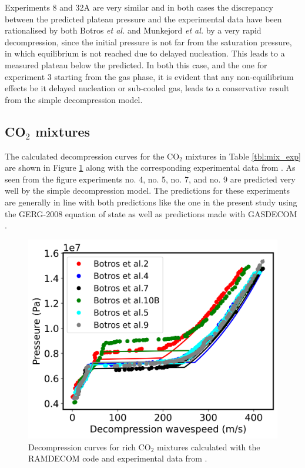 \documentclass[a4paper, 10pt, twocolumn, twoside]{scrartcl}
\begin{document}
Experiments 8 and 32A are very similar and in both cases the discrepancy between the predicted plateau pressure and the experimental data have been rationalised by both Botros \emph{et al.} \cite{Botros_pure} and Munkejord \emph{et al.} \cite{MUNKEJORD2020118560} by a very rapid decompression, since the initial pressure is not far from the saturation pressure, in which equilibrium is not reached due to delayed nucleation. This leads to a measured plateau below the predicted. In both this case, and the one for experiment 3 starting from the gas phase, it is evident that any non-equilibrium effects be it delayed nucleation or sub-cooled gas, leads to a conservative result from the simple decompression model. 



\subsection{CO$_2$ mixtures}
The calculated decompression curves for the CO$_2$ mixtures in Table \ref{tbl:mix_exp} are shown in Figure \ref{fig:mix_combined} along with the corresponding experimental data from \cite{Botros_mixture}. As seen from the figure experiments no. 4, no. 5, no. 7, and no. 9 are predicted very well by the simple decompression model. The predictions for these experiments are generally in line with both predictions like the one in the present study using the GERG-2008 \cite{Botros_mixture} equation of state as well as predictions made with GASDECOM \cite{Cosham_GASDECOM}.

\begin{figure}[!ht]
	\centering
	\includegraphics[width=\columnwidth]{./Bilder/mix_combined.png}
	\caption{Decompression curves for rich CO$_2$ mixtures calculated with the RAMDECOM code and experimental data from \cite{Botros_mixture}.}
	\label{fig:mix_combined}
\end{figure}
\end{document}
